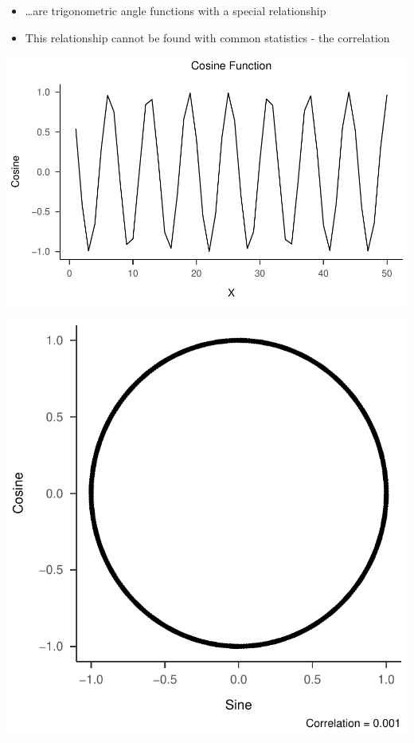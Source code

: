 \documentclass[
]{book}
\providecommand{\tightlist}{%
  \setlength{\itemsep}{0pt}\setlength{\parskip}{0pt}}
\begin{document}
\begin{itemize}
\tightlist
\item
  \ldots are trigonometric angle functions with a special relationship
\item
  This relationship cannot be found with common statistics - the correlation
\end{itemize}

\includegraphics{_main_files/figure-latex/unnamed-chunk-42-1.pdf}

\includegraphics{_main_files/figure-latex/unnamed-chunk-43-1.pdf}
\end{document}

